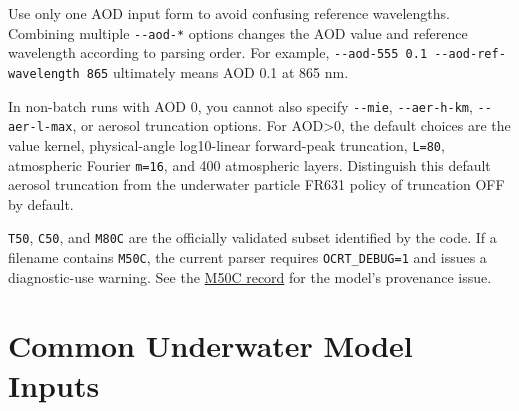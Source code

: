 Use only one AOD input form to avoid confusing reference wavelengths. Combining multiple \texttt{-\allowbreak{}-\allowbreak{}aod-\allowbreak{}*} options changes the AOD value and reference wavelength according to parsing order. For example, \texttt{-\allowbreak{}-\allowbreak{}aod-\allowbreak{}555 0.\allowbreak{}1 -\allowbreak{}-\allowbreak{}aod-\allowbreak{}ref-\allowbreak{}wavelength 865} ultimately means AOD 0.1 at 865 nm.

In non-batch runs with AOD 0, you cannot also specify \texttt{-\allowbreak{}-\allowbreak{}mie}, \texttt{-\allowbreak{}-\allowbreak{}aer-\allowbreak{}h-\allowbreak{}km}, \texttt{-\allowbreak{}-\allowbreak{}aer-\allowbreak{}l-\allowbreak{}max}, or aerosol truncation options. For AOD>0, the default choices are the value kernel, physical-angle log10-linear forward-peak truncation, \texttt{L=\allowbreak{}80}, atmospheric Fourier \texttt{m=\allowbreak{}16}, and 400 atmospheric layers. Distinguish this default aerosol truncation from the underwater particle FR631 policy of truncation OFF by default.

\texttt{T50}, \texttt{C50}, and \texttt{M80C} are the officially validated subset identified by the code. If a filename contains \texttt{M50C}, the current parser requires \texttt{OCRT\_\allowbreak{}DEBUG=\allowbreak{}1} and issues a diagnostic-use warning. See the \href{https://github.com/brtnt/OCRT/blob/54861c68e35ec5aaa3938fad53e93dc2dfa7eb1d/code/OCRT_C/inputs/deprecated/DEPRECATED_M50C.md}{M50C record} for the model's provenance issue.

\section{Common Underwater Model Inputs}
\label{sec:auto:03_options:5}




